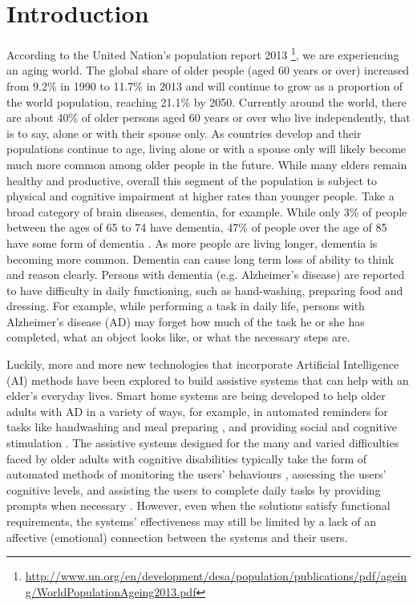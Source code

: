 \chapter{Introduction}
\label{chap:intro}

According to the United Nation's population report 2013 \footnote{\url{http://www.un.org/en/development/desa/population/publications/pdf/ageing/WorldPopulationAgeing2013.pdf}}, we are experiencing an aging world. The global share of older people (aged 60 years or over) increased from 9.2\% in 1990 to 11.7\%  in 2013 and will continue to grow as a proportion of the world population, reaching 21.1\% by 2050. Currently around the world, there are about 40\% of older persons aged 60 years or over who live independently, that is to say, alone or with their spouse only. As countries develop and their populations continue to age, living alone or with a spouse only will likely become much more common among older people in the future. While many elders remain healthy and productive, overall this segment of the population is subject to physical and cognitive impairment at higher rates than younger people. Take a broad category of brain diseases, dementia, for example. While only 3\% of people between the ages of 65 to 74 have dementia, 47\% of people over the age of 85 have some form of dementia \cite{budson2011memory}. As more people are living longer, dementia is becoming more common. Dementia can cause long term loss of ability to think and reason clearly. Persons with dementia (e.g. Alzheimer's disease) are reported to have difficulty in daily functioning, such as hand-washing, preparing food and dressing. For example, while performing a task in daily life, persons with Alzheimer's disease (AD) may forget how much of the task he or she has completed, what an object looks like, or what the necessary steps are.

Luckily, more and more new technologies that incorporate Artificial Intelligence (AI) methods have been explored to build assistive systems that can help with an elder's everyday lives. Smart home systems are being developed to help older adults with AD in a variety of ways, for example, in automated reminders for tasks like handwashing \cite{hoey2010automated} and meal preparing \cite{philipose2004inferring}, and providing social and cognitive stimulation \cite{kaye2011intelligent}. The assistive systems designed for the many and varied difficulties faced by older adults with cognitive disabilities typically take the form of automated methods of monitoring the users' behaviours \cite{hoey2012lacasa}, assessing the users' cognitive levels, and assisting the users to complete daily tasks by providing prompts when necessary \cite{boger2005decision, peters2014automatic, hoey2010automated}. However, even when the solutions satisfy functional requirements, the systems' effectiveness may still be limited by a lack of an affective (emotional) connection between the systems and their users.

